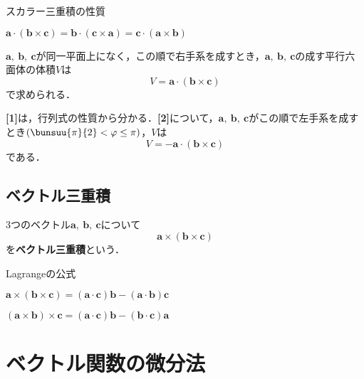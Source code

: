\begin{kousiki}{スカラー三重積の性質}
	\begin{enumerate}[label=\textbf{[\arabic*]}, labelsep=10pt, leftmargin=23pt]
		\item $\bm{a} \cdot (\bm{b} \times \bm{c}) = \bm{b} \cdot (\bm{c} \times \bm{a}) = \bm{c} \cdot (\bm{a} \times \bm{b})$
		\item $\bm{a},\ \bm{b},\ \bm{c}$が同一平面上になく，この順で右手系を成すとき，$\bm{a},\ \bm{b},\ \bm{c}$の成す平行六面体の体積$V$は
		\begin{equation}
			V = \bm{a} \cdot (\bm{b} \times \bm{c})
		\end{equation}
		で求められる．
	\end{enumerate}
\end{kousiki}

\textbf{[1]}は，行列式の性質から分かる．\textbf{[2]}について，$\bm{a},\ \bm{b},\ \bm{c}$がこの順で左手系を成すとき$\left(\bunsuu{\pi}{2} < \varphi \le \pi\right)$，$V$は
\begin{equation}
	V = -\bm{a} \cdot (\bm{b} \times \bm{c})
\end{equation}
である．



\subsection{ベクトル三重積}

3つのベクトル$\bm{a},\ \bm{b},\ \bm{c}$について
\begin{equation}
	\bm{a} \times (\bm{b} \times \bm{c})
\end{equation}
を\textbf{ベクトル三重積}という．

\begin{kousiki}{Lagrangeの公式}
	\begin{enumerate}[label=\textbf{[\arabic*]}, labelsep=10pt, leftmargin=23pt]
		\item $\bm{a} \times (\bm{b} \times \bm{c}) = (\bm{a} \cdot \bm{c})\bm{b} - (\bm{a} \cdot \bm{b})\bm{c}$
		\item $(\bm{a} \times \bm{b}) \times \bm{c} = (\bm{a} \cdot \bm{c})\bm{b} - (\bm{b} \cdot \bm{c})\bm{a}$
	\end{enumerate}
\end{kousiki}



\section{ベクトル関数の微分法}
